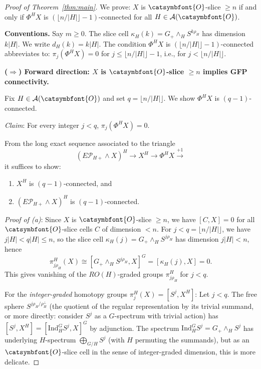 \documentclass[12pt]{article}
\newcommand{\aO}{{\catsymbfont{O}}}
\theoremstyle{definition}
\begin{document}
\begin{proof}[Proof of Theorem~\ref{thm:main}]

We prove: $X$ is $\aO$-slice $\geq n$ if and only if $\Phi^H X$ is $(\lfloor n/|H|\rfloor - 1)$-connected for all $H\in\mathcal{A}(\aO)$.

\medskip
\noindent\textbf{Conventions.}  Say $m\geq 0$.  The slice cell $\kappa_H(k) = G_+\wedge_H S^{k\rho_H}$ has dimension $k|H|$.  We write $d_H(k) = k|H|$.  The condition $\Phi^H X$ is $(\lfloor n/|H|\rfloor - 1)$-connected abbreviates to: $\pi_j(\Phi^H X) = 0$ for $j \leq \lfloor n/|H|\rfloor - 1$, i.e., for $j < \lfloor n/|H|\rfloor$.

\medskip
\noindent\textbf{($\Rightarrow$) Forward direction: $X$ is $\aO$-slice $\geq n$ implies GFP connectivity.}

Fix $H\in\mathcal{A}(\aO)$ and set $q = \lfloor n/|H|\rfloor$.  We show $\Phi^H X$ is $(q-1)$-connected.

\textit{Claim}: For every integer $j < q$, $\pi_j(\Phi^H X) = 0$.

From the long exact sequence associated to the triangle
\begin{equation}\label{eq:triangle-again}
  (E\mathcal{P}_{H+}\wedge X)^H \to X^H \to \Phi^H X \xrightarrow{+1}
\end{equation}
it suffices to show:
\begin{enumerate}[label=(\alph*)]
   \item $X^H$ is $(q-1)$-connected, and
   \item $(E\mathcal{P}_{H+}\wedge X)^H$ is $(q-1)$-connected.
\end{enumerate}

\noindent\emph{Proof of (a)}: Since $X$ is $\aO$-slice $\geq n$, we have $[C, X] = 0$ for all $\aO$-slice cells $C$ of dimension $< n$.  For $j < q = \lfloor n/|H|\rfloor$, we have $j|H| < q|H| \leq n$, so the slice cell $\kappa_H(j) = G_+\wedge_H S^{j\rho_H}$ has dimension $j|H| < n$, hence
\[
   \pi_{j\rho_H}^H(X) \cong [G_+\wedge_H S^{j\rho_H}, X]^G = [\kappa_H(j), X] = 0.
\]
This gives vanishing of the $RO(H)$-graded groups $\pi_{j\rho_H}^H$ for $j < q$.

For the \emph{integer-graded} homotopy groups $\pi_j^H(X) = [S^j, X^H]$: Let $j < q$.  The free sphere $S^{j\rho_H / \rho_H^{\perp}}$ (the quotient of the regular representation by its trivial summand, or more directly: consider $S^j$ as a $G$-spectrum with trivial action) has $[S^j, X^H] = [\mathrm{Ind}_H^G S^j, X]^G$ by adjunction.  The spectrum $\mathrm{Ind}_H^G S^j = G_+\wedge_H S^j$ has underlying $H$-spectrum $\bigoplus_{G/H} S^j$ (with $H$ permuting the summands), but as an $\aO$-slice cell in the sense of integer-graded dimension, this is more delicate.


\end{proof}
\end{document}
